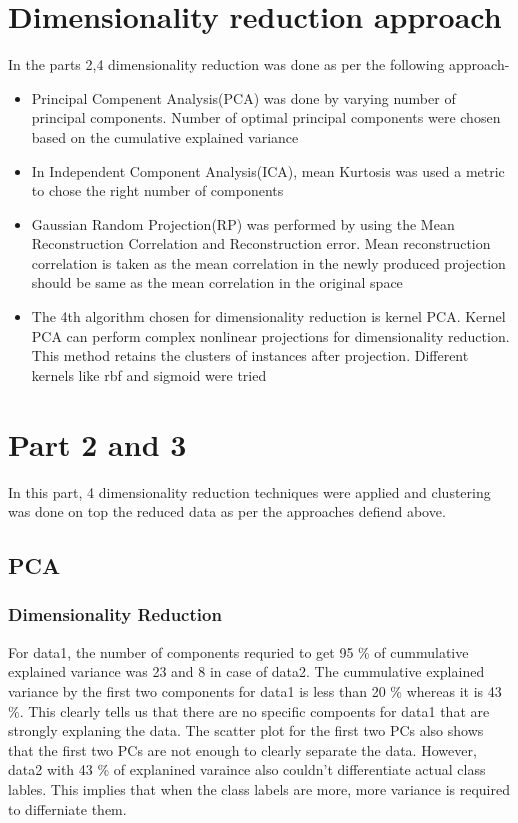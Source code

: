 \documentclass[12pt]{article}
\begin{document}
\section{Dimensionality reduction approach}
In the parts 2,4 dimensionality reduction was done as per the following approach-
\begin{itemize}

\item Principal Compenent Analysis(PCA) was done by varying number of principal components. Number of optimal principal components were chosen based on the cumulative explained variance
\item In Independent Component Analysis(ICA), mean Kurtosis was used a metric to chose the right number of components

\item Gaussian Random Projection(RP) was performed by using the Mean Reconstruction Correlation and Reconstruction error. Mean reconstruction correlation is taken as the mean correlation in the newly produced projection should be same as the mean correlation in the original space
\item The 4th algorithm chosen for dimensionality reduction is kernel PCA. Kernel PCA can perform complex nonlinear projections for dimensionality reduction. This method retains the clusters of instances after projection. Different kernels like rbf and sigmoid were tried



\end{itemize}


\section{Part 2 and 3}
In this part, 4 dimensionality reduction techniques were applied and clustering was done on top the reduced data as per the approaches defiend above. 
\subsection{PCA}
\subsubsection*{Dimensionality Reduction}
For data1, the number of components requried to get 95 \% of cummulative explained variance was 23 and 8 in case of data2. The cummulative explained variance by the first two components for data1 is less than 20 \% whereas it is 43 \%. This clearly tells us that there are no specific compoents for data1 that are strongly explaning the data. The scatter plot for the first two PCs also shows that the first two PCs are not enough to clearly separate the data. However, data2 with 43 \% of explanined varaince also couldn't differentiate actual class lables. This implies that when the class labels are more, more variance is required to differniate them.
\end{document}
